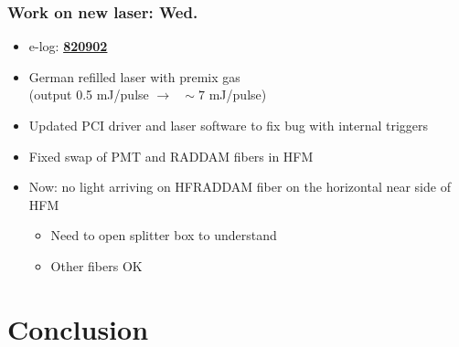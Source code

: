 \documentclass[bigger]{beamer}
\providecommand{\alert}[1]{\textbf{#1}}
\begin{document}
\begin{frame}
\frametitle{Work on new laser: Wed.}
\label{sec-3-1-2}
\begin{itemize}

\item e-log: \href{http://cmsonline.cern.ch/cms-elog/820902}{\alert{820902}}
\label{sec-3-1-2-1}%

\item German refilled laser with premix gas\\
\label{sec-3-1-2-2}%
(output 0.5 mJ/pulse $\rightarrow \text{ } \sim 7$ mJ/pulse)

\item Updated PCI driver and laser software to fix bug with internal triggers
\label{sec-3-1-2-3}%

\item Fixed swap of PMT and RADDAM fibers in HFM
\label{sec-3-1-2-4}%

\item Now: no light arriving on HFRADDAM fiber on the horizontal near side of HFM
\label{sec-3-1-2-5}%
\begin{itemize}

\item Need to open splitter box to understand
\label{sec-3-1-2-5-1}%

\item Other fibers OK
\label{sec-3-1-2-5-2}%
\end{itemize} %
\end{itemize} %
\end{frame}
\section{Conclusion}
\label{sec-4}
\end{document}
